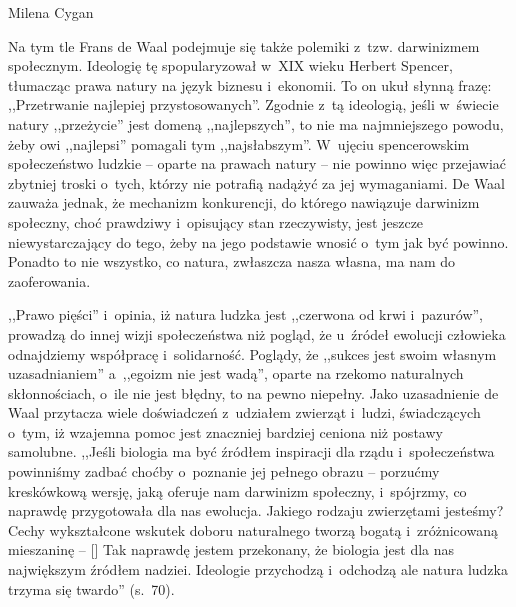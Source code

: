 \begin{recplenv}{Milena Cygan}
\enlargethispage{-.5\baselineskip}

Na tym tle Frans de Waal podejmuje się także polemiki z~tzw. darwinizmem społecznym. Ideologię tę spopularyzował w~XIX
wieku Herbert Spencer, tłumacząc prawa natury na język biznesu i~ekonomii. To on ukuł słynną frazę: ,,Przetrwanie
najlepiej przystosowanych''. Zgodnie z~tą ideologią, jeśli w~świecie natury ,,przeżycie'' jest domeną ,,najlepszych'', to
nie ma najmniejszego powodu, żeby owi ,,najlepsi'' pomagali tym ,,najsłabszym''. W~ujęciu spencerowskim społeczeństwo
ludzkie -- oparte na prawach natury -- nie powinno więc przejawiać zbytniej troski o~tych, którzy nie potrafią nadążyć za
jej wymaganiami. De Waal zauważa jednak, że mechanizm konkurencji, do którego nawiązuje darwinizm społeczny, choć
prawdziwy i~opisujący stan rzeczywisty, jest jeszcze niewystarczający do tego, żeby na jego podstawie wnosić o~tym jak
być powinno. Ponadto to nie wszystko, co natura, zwłaszcza nasza własna, ma nam do zaoferowania. 

,,Prawo pięści'' i~opinia, iż natura ludzka jest ,,czerwona od krwi i~pazurów'', prowadzą do innej wizji społeczeństwa niż
pogląd, że u~źródeł ewolucji człowieka odnajdziemy współpracę i~solidarność. Poglądy, że ,,sukces jest swoim własnym
uzasadnianiem'' a~,,egoizm nie jest wadą'', oparte na rzekomo naturalnych skłonnościach, o~ile nie jest błędny, to na
pewno niepełny. Jako uzasadnienie de Waal przytacza wiele doświadczeń z~udziałem zwierząt i~ludzi, świadczących o~tym,
iż wzajemna pomoc jest znaczniej bardziej ceniona niż postawy samolubne. ,,Jeśli biologia ma być źródłem inspiracji dla
rządu i~społeczeństwa powinniśmy zadbać choćby o~poznanie jej pełnego obrazu -- porzućmy kreskówkową wersję, jaką
oferuje nam darwinizm społeczny, i~spójrzmy, co naprawdę przygotowała dla nas ewolucja. Jakiego rodzaju zwierzętami
jesteśmy? Cechy wykształcone wskutek doboru naturalnego tworzą bogatą i~zróżnicowaną mieszaninę -- [\mydots] Tak naprawdę
jestem przekonany, że biologia jest dla nas największym źródłem nadziei. Ideologie przychodzą i~odchodzą ale natura
ludzka trzyma się twardo'' (s.~70).


\end{recplenv}
